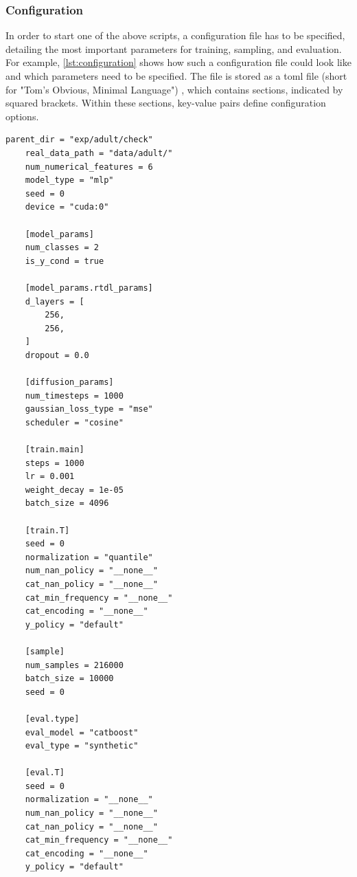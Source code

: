 \subsubsection[]{Configuration}

In order to start one of the above scripts, a configuration file has to be specified, detailing the most important parameters for training, sampling, and evaluation.
For example, \autoref{lst:configuration} shows how such a configuration file could look like and which parameters need to be specified.
The file is stored as a \gls{toml}  file (short for "Tom's Obvious, Minimal Language") \cite{preston-werner2021TOMLTomObviousa}, which contains sections, indicated by squared brackets. 
Within these sections, key-value pairs define configuration options.

\begin{lstlisting}[label={lst:configuration}, caption={Example Configuration File}]
    parent_dir = "exp/adult/check"
    real_data_path = "data/adult/"
    num_numerical_features = 6
    model_type = "mlp"
    seed = 0
    device = "cuda:0"

    [model_params]
    num_classes = 2
    is_y_cond = true

    [model_params.rtdl_params]
    d_layers = [
        256,
        256,
    ]
    dropout = 0.0

    [diffusion_params]
    num_timesteps = 1000
    gaussian_loss_type = "mse"
    scheduler = "cosine"

    [train.main]
    steps = 1000
    lr = 0.001
    weight_decay = 1e-05
    batch_size = 4096

    [train.T]
    seed = 0
    normalization = "quantile"
    num_nan_policy = "__none__"
    cat_nan_policy = "__none__"
    cat_min_frequency = "__none__"
    cat_encoding = "__none__"
    y_policy = "default"

    [sample]
    num_samples = 216000
    batch_size = 10000
    seed = 0

    [eval.type]
    eval_model = "catboost"
    eval_type = "synthetic"

    [eval.T]
    seed = 0
    normalization = "__none__"
    num_nan_policy = "__none__"
    cat_nan_policy = "__none__"
    cat_min_frequency = "__none__"
    cat_encoding = "__none__"
    y_policy = "default"
\end{lstlisting}


